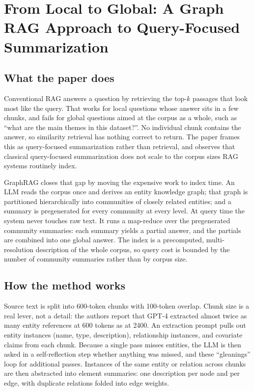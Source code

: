 \section{From Local to Global: A Graph RAG Approach to Query-Focused Summarization}

\subsection{What the paper does}

Conventional RAG answers a question by retrieving the top-$k$ passages that look most like the query. That works for local questions whose answer sits in a few chunks, and fails for global questions aimed at the corpus as a whole, such as ``what are the main themes in this dataset?''. No individual chunk contains the answer, so similarity retrieval has nothing correct to return. The paper frames this as query-focused summarization rather than retrieval, and observes that classical query-focused summarization does not scale to the corpus sizes RAG systems routinely index.

GraphRAG closes that gap by moving the expensive work to index time. An LLM reads the corpus once and derives an entity knowledge graph; that graph is partitioned hierarchically into communities of closely related entities; and a summary is pregenerated for every community at every level. At query time the system never touches raw text. It runs a map-reduce over the pregenerated community summaries: each summary yields a partial answer, and the partials are combined into one global answer. The index is a precomputed, multi-resolution description of the whole corpus, so query cost is bounded by the number of community summaries rather than by corpus size.

\subsection{How the method works}

Source text is split into 600-token chunks with 100-token overlap. Chunk size is a real lever, not a detail: the authors report that GPT-4 extracted almost twice as many entity references at 600 tokens as at 2400. An extraction prompt pulls out entity instances (name, type, description), relationship instances, and covariate claims from each chunk. Because a single pass misses entities, the LLM is then asked in a self-reflection step whether anything was missed, and these ``gleanings'' loop for additional passes. Instances of the same entity or relation across chunks are then abstracted into element summaries: one description per node and per edge, with duplicate relations folded into edge weights.

